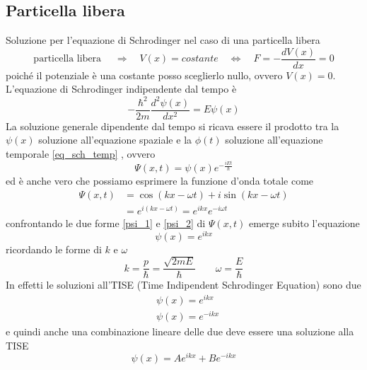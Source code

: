 \subsection{Particella libera} Soluzione per l'equazione di Schrodinger nel caso di una particella libera
\begin{equation}
\mbox{particella libera } \quad\Rightarrow\quad V(x) = costante \quad\Leftrightarrow\quad  F = - \frac{ dV(x)}{dx } = 0
\end{equation}
poiché il potenziale è una costante posso sceglierlo nullo, ovvero $V(x) = 0$.
L'equazione di Schrodinger indipendente dal tempo è
\begin{equation}
- \frac{ \hbar^2}{2m } \frac{ d^2 \psi(x)}{dx^2 } = E \psi(x)
\end{equation}
La soluzione generale dipendente dal tempo si ricava essere il prodotto tra la $\psi(x)$ soluzione all'equazione spaziale e la $\phi(t)$ soluzione all'equazione temporale \ref{eq_sch_temp} , ovvero
\begin{equation}
\Psi(x, t) = \psi(x) e^{ -\frac{ i E t}{\hbar } }
\label{psi_1}
\end{equation}
ed è anche vero che possiamo esprimere la funzione d'onda totale come 
\begin{equation}
\begin{split}
\Psi (x,t) & = \cos(kx-\omega t) + i \sin(kx - \omega t) \\
& = e^{ i (kx - \omega t) } = e^{ ikx } e^{ -i \omega t }
\end{split}
\label{psi_2}
\end{equation}
confrontando le due forme \ref{psi_1} e \ref{psi_2} di $\Psi(x, t)$ emerge subito l'equazione
\begin{equation}
\psi(x) = e^{ ikx }
\end{equation}
ricordando le forme di $k$ e $\omega$
\begin{equation}
k = \frac{ p}{\hbar } = \frac{ \sqrt{2mE}}{\hbar } \quad \quad \omega=\frac{ E}{\hbar }
\end{equation}
In effetti le soluzioni all'TISE (Time Indipendent Schrodinger Equation) sono due
\begin{equation}
\begin{split}
& \psi(x) = e^{ ikx } \\
& \psi(x) = e^{ - ikx }
\end{split}
\end{equation}
e quindi anche una combinazione lineare delle due deve essere una soluzione alla TISE
\begin{equation}
\psi(x) = A e^{ ikx } + B e^{- ikx }
\end{equation}

